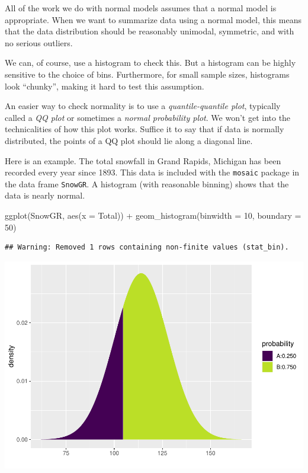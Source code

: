 \documentclass[
]{book}
\newenvironment{Shaded}{\begin{snugshade}}{\end{snugshade}}
\newcommand{\AttributeTok}[1]{\textcolor[rgb]{0.77,0.63,0.00}{#1}}
\newcommand{\DecValTok}[1]{\textcolor[rgb]{0.00,0.00,0.81}{#1}}
\newcommand{\FunctionTok}[1]{\textcolor[rgb]{0.00,0.00,0.00}{#1}}
\newcommand{\NormalTok}[1]{#1}
\newcommand{\SpecialCharTok}[1]{\textcolor[rgb]{0.00,0.00,0.00}{#1}}
\begin{document}
All of the work we do with normal models assumes that a normal model is appropriate. When we want to summarize data using a normal model, this means that the data distribution should be reasonably unimodal, symmetric, and with no serious outliers.

We can, of course, use a histogram to check this. But a histogram can be highly sensitive to the choice of bins. Furthermore, for small sample sizes, histograms look ``chunky'', making it hard to test this assumption.

An easier way to check normality is to use a \emph{quantile-quantile plot}, typically called a \emph{QQ plot} or sometimes a \emph{normal probability plot}. We won't get into the technicalities of how this plot works. Suffice it to say that if data is normally distributed, the points of a QQ plot should lie along a diagonal line.

Here is an example. The total snowfall in Grand Rapids, Michigan has been recorded every year since 1893. This data is included with the \texttt{mosaic} package in the data frame \texttt{SnowGR}. A histogram (with reasonable binning) shows that the data is nearly normal.

\begin{Shaded}
\begin{Highlighting}[]
\FunctionTok{ggplot}\NormalTok{(SnowGR, }\FunctionTok{aes}\NormalTok{(}\AttributeTok{x =}\NormalTok{ Total)) }\SpecialCharTok{+}
    \FunctionTok{geom\_histogram}\NormalTok{(}\AttributeTok{binwidth =} \DecValTok{10}\NormalTok{, }\AttributeTok{boundary =} \DecValTok{50}\NormalTok{)}
\end{Highlighting}
\end{Shaded}

\begin{verbatim}
## Warning: Removed 1 rows containing non-finite values (stat_bin).
\end{verbatim}

\includegraphics{intro_stats_files/figure-latex/unnamed-chunk-357-1.pdf}
\end{document}
